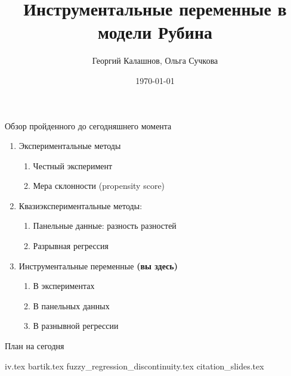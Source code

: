 \documentclass[12pt]{beamer}
\title{Инструментальные переменные в модели Рубина}
\author[Георгий Калашнов, Ольга Сучкова]{Георгий Калашнов, Ольга Сучкова}
\date{\today}
\begin{document}
\begin{frame}
  \titlepage
  
\end{frame}




\begin{frame}{Обзор пройденного до сегодняшнего момента}
\begin{enumerate}
    \item Экспериментальные методы
    \begin{enumerate}
        \item Честный эксперимент
        \item Мера склонности (propensity score)
    \end{enumerate}
    \item Квазиэкспериментальные методы:
    \begin{enumerate}
        \item Панельные данные: разность разностей
        \item Разрывная регрессия
    \end{enumerate}
        \item Инструментальные переменные \textbf{(вы здесь)}
    \begin{enumerate}
        \item В экспериментах
        \item В панельных данных
        \item В разнывной регрессии
    \end{enumerate}
\end{enumerate}
\end{frame}

\begin{frame}{План на сегодня} 
\tableofcontents
\end{frame}


{iv.tex}
{bartik.tex}
{fuzzy_regression_discontinuity.tex}
{citation_slides.tex}
\end{document}
